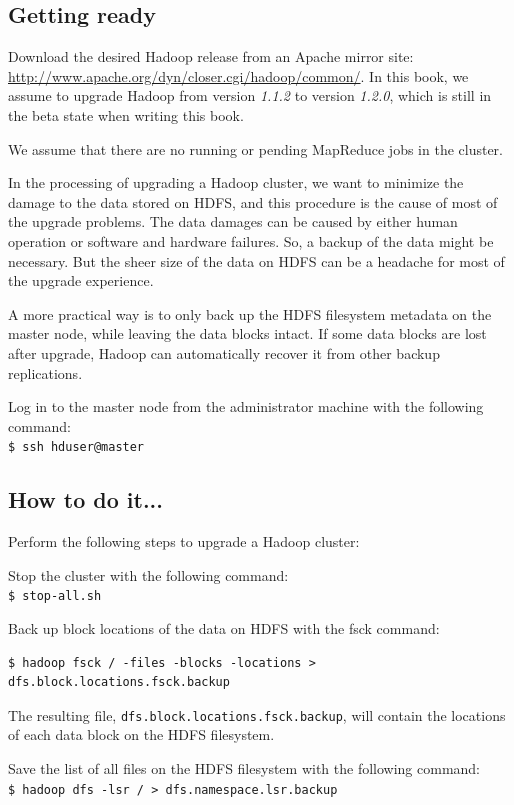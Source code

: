 \subsection*{Getting ready}
Download the desired Hadoop release from an Apache mirror site: \url{http://www.apache.org/dyn/closer.cgi/hadoop/common/}. In this book, we assume to upgrade Hadoop from version \emph{1.1.2} to version \emph{1.2.0}, which is still in the beta state when writing this book.

We assume that there are no running or pending MapReduce jobs in the cluster.

In the processing of upgrading a Hadoop cluster, we want to minimize the damage to the data stored on HDFS, and this procedure is the cause of most of the upgrade problems. The data damages can be caused by either human operation or software and hardware failures. So, a backup of the data might be necessary. But the sheer size of the data on HDFS can be a headache for most of the upgrade experience.

A more practical way is to only back up the HDFS filesystem metadata on the master node, while leaving the data blocks intact. If some data blocks are lost after upgrade, Hadoop can automatically recover it from other backup replications.

Log in to the master node from the administrator machine with the following command: \\
\verb|$ ssh hduser@master|

\subsection*{How to do it...}
Perform the following steps to upgrade a Hadoop cluster: 

Stop the cluster with the following command: \\
\verb|$ stop-all.sh|

Back up block locations of the data on HDFS with the fsck command:
\lstset{style=bashstyle}
\begin{lstlisting}$ hadoop fsck / -files -blocks -locations > dfs.block.locations.fsck.backup
\end{lstlisting}

The resulting file, \verb|dfs.block.locations.fsck.backup|, will contain the locations of each data block on the HDFS filesystem.

Save the list of all files on the HDFS filesystem with the following command: \\
\verb|$ hadoop dfs -lsr / > dfs.namespace.lsr.backup|

